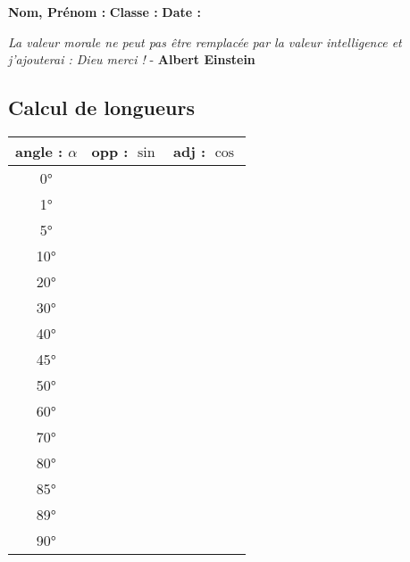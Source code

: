 



\textbf{Nom, Prénom :} \hspace{8cm} \textbf{Classe :} \hspace{3cm} \textbf{Date :}\\

\vspace{-0.5cm} \begin{center}
  \textit{La valeur morale ne peut pas être remplacée par la valeur intelligence et j'ajouterai : Dieu merci !}  - \textbf{Albert Einstein}
\end{center}


\begin{minipage}[t]{0.3\textwidth}
\subsection*{Calcul de longueurs}

\begin{center}
  \begin{tabular}{|c|c|c|}
    \hline
    angle : $\alpha$ & opp : $\sin$ & adj : $\cos$\\  \hline
       0°          &           &          \\  \hline
       1°          &           &          \\  \hline
       5°          &           &          \\  \hline
       10°         &           &          \\  \hline
       20°         &           &          \\  \hline
       30°         &           &          \\  \hline
       40°         &           &          \\  \hline
       45°         &           &          \\  \hline
       50°         &           &          \\  \hline
       60°         &           &          \\  \hline
       70°         &           &          \\  \hline
       80°         &           &          \\  \hline
       85°         &           &          \\  \hline
       89°         &           &          \\  \hline
       90°         &           &          \\  \hline
  \end{tabular}
\end{center}

\end{minipage}
